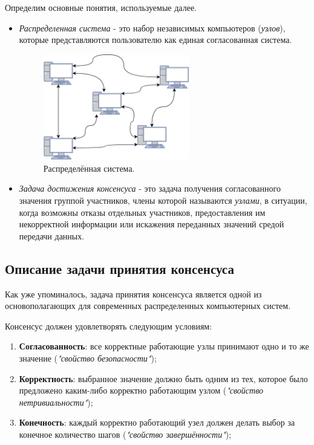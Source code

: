 \documentclass[subf, href, colorlinks=true, 14pt,
times, mtpro, specialist]{disser}
\theoremstyle{definition}
\begin{document}
Определим основные понятия, используемые далее.
\begin{itemize}
\item \emph{Распределенная система} - это набор независимых компьютеров (\emph{узлов}), которые представляются пользователю как единая согласованная система.

\begin{figure}[H]
\label{fig:dist_sys}
\centering
\includegraphics[width=0.6\textwidth]{src/pics/dist_sys.png}
\caption{Распределённая система.}
\end{figure}

\item \emph{Задача достижения консенсуса} - это задача получения согласованного значения группой участников, члены которой называются \emph{узлами}, в ситуации, когда возможны отказы отдельных участников, предоставления им некорректной информации или искажения переданных значений средой передачи данных.
\end{itemize}



\subsection{Описание задачи принятия консенсуса}

Как уже упоминалось, задача принятия консенсуса является одной из основополагающих для современных распределенных компьютерных систем. 

Консенсус должен удовлетворять следующим условиям:
\begin{enumerate}
\item \textbf{Согласованность}: все корректные работающие узлы принимают одно и то же значение (\textit{"свойство безопасности"});
\item \textbf{Корректность}: выбранное значение должно быть одним из тех, которое было предложено каким-либо корректно работающим узлом (\textit{"свойство нетривиальности"});
\item \textbf{Конечность}: каждый корректно работающий узел должен делать выбор за конечное количество шагов (\textit{"свойство завершённости"});
\end{enumerate}
\end{document}
